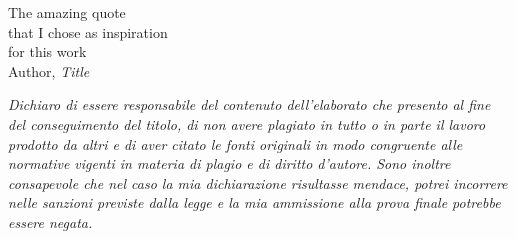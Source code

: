 \thispagestyle{empty}
\begin{flushright}

    \vspace*{60mm}

    The amazing quote\\
    that I chose as inspiration\\
    for this work\\
    \vspace{4mm}
    Author, \textit{Title}\\




\end{flushright}

\vspace*{110mm}
\noindent
\emph{Dichiaro di essere responsabile del contenuto dell'elaborato che presento al fine del
    conseguimento del titolo, di non avere plagiato in tutto o in parte il lavoro prodotto da
    altri e di aver citato le fonti originali in modo congruente alle normative vigenti in
    materia di plagio e di diritto d'autore. Sono inoltre consapevole che nel caso la mia
    dichiarazione risultasse mendace, potrei incorrere nelle sanzioni previste dalla legge e
    la mia ammissione alla prova finale potrebbe essere negata.}